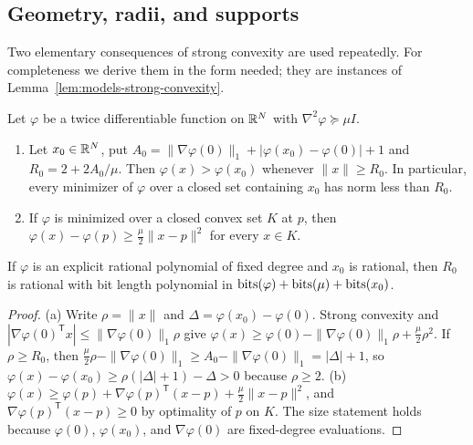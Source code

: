 \subsection{Geometry, radii, and supports}
\label{app:constraints-geometry}

Two elementary consequences of strong convexity are used repeatedly. For
completeness we derive them in the form needed; they are instances of
Lemma~\ref{lem:models-strong-convexity}.

\begin{lemma}
\label{lem:constraints-radius}
Let $\varphi$ be a twice differentiable function on $\mathbb R^N$ with
$\nabla^2\varphi\succeq\mu I$.
\begin{enumerate}[label=(\alph*)]
\item Let $x_0\in\mathbb R^N$, put
$A_0=\|\nabla\varphi(0)\|_1+|\varphi(x_0)-\varphi(0)|+1$ and
$R_0=2+2A_0/\mu$. Then $\varphi(x)>\varphi(x_0)$ whenever $\|x\|\ge R_0$. In
particular, every minimizer of $\varphi$ over a closed set containing $x_0$
has norm less than $R_0$.
\item If $\varphi$ is minimized over a closed convex set $K$ at $p$, then
$\varphi(x)-\varphi(p)\ge\frac\mu2\|x-p\|^2$ for every $x\in K$.
\end{enumerate}
If $\varphi$ is an explicit rational polynomial of fixed degree and $x_0$ is
rational, then $R_0$ is rational with bit length polynomial in
$\operatorname{bits}(\varphi)+\operatorname{bits}(\mu)+\operatorname{bits}(x_0)$.
\end{lemma}

\begin{proof}
(a) Write $\rho=\|x\|$ and $\Delta=\varphi(x_0)-\varphi(0)$. Strong convexity
and $|\nabla\varphi(0)^{\mathsf T}x|\le\|\nabla\varphi(0)\|_1\rho$ give
$\varphi(x)\ge\varphi(0)-\|\nabla\varphi(0)\|_1\rho+\frac\mu2\rho^2$. If
$\rho\ge R_0$, then $\frac\mu2\rho-\|\nabla\varphi(0)\|_1\ge A_0-\|\nabla\varphi(0)\|_1=|\Delta|+1$,
so $\varphi(x)-\varphi(x_0)\ge\rho(|\Delta|+1)-\Delta>0$ because $\rho\ge2$.
(b) $\varphi(x)\ge\varphi(p)+\nabla\varphi(p)^{\mathsf T}(x-p)+\frac\mu2\|x-p\|^2$,
and $\nabla\varphi(p)^{\mathsf T}(x-p)\ge0$ by optimality of $p$ on $K$.
The size statement holds because $\varphi(0)$, $\varphi(x_0)$, and
$\nabla\varphi(0)$ are fixed-degree evaluations.
\end{proof}

